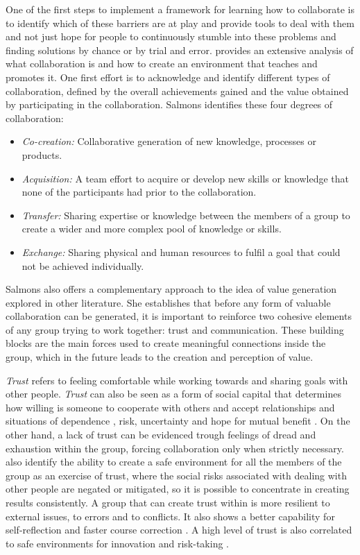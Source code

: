 One of the first steps to implement a framework for learning how to collaborate is to identify which of these barriers are at play and provide tools to deal with them and not just hope for people to continuously stumble into these problems and finding solutions by
chance or by trial and error. \textcite{salmons_2019} provides an extensive analysis of what collaboration is and how to create an environment that teaches and promotes it. One first effort is to acknowledge and identify different types of collaboration, defined
by the overall achievements gained and the value obtained by participating in the collaboration. Salmons identifies these four degrees of collaboration:

\begin{itemize}
    \item \emph{Co-creation:} Collaborative generation of new knowledge, processes or products.
    \item \emph{Acquisition:} A team effort to acquire or develop new skills or knowledge that none of the participants had prior to the collaboration.
    \item \emph{Transfer:} Sharing expertise or knowledge between the members of a group to create a wider and more complex pool of knowledge or skills.
    \item \emph{Exchange:} Sharing physical and human resources to fulfil a goal that could not be achieved individually.
\end{itemize}

Salmons also offers a complementary approach to the idea of value generation explored in other literature. She establishes that before any form of valuable collaboration can be generated, it is important to reinforce two cohesive elements of any group trying to work
together: trust and communication. These building blocks are the main forces used to create meaningful connections inside the group, which in the future leads to the creation and perception of value.

\emph{Trust} refers to feeling comfortable while working towards and sharing goals with other people. \emph{Trust} can also be seen as a form of social capital \parencite{addison_2020} that determines how willing is someone to cooperate with others and accept
relationships and situations of dependence \parencite{zand_1972}, risk, uncertainty \parencite{frederiksen_2014} and hope for mutual benefit \parencite{kramer_1996}. On the other hand, a lack of trust can be evidenced trough feelings of dread and exhaustion
within the group, forcing collaboration only when strictly necessary. \textcite{vangen_2012} also identify the ability to create a safe environment for all the members of the group as an exercise of trust, where the social risks associated with dealing with
other people are negated or mitigated, so it is possible to concentrate in creating results consistently. A group that can create trust within is more resilient to external issues, to errors and to conflicts. It also shows a better capability for self-reflection
and faster course correction \parencite{shinya_2016}. A high level of trust is also correlated to safe environments for innovation and risk-taking \parencite{bichard_2005}.

